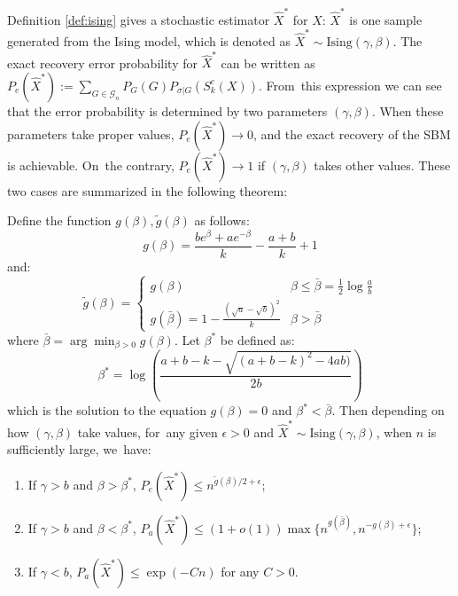 \documentclass[entropy,article,accept,moreauthors,pdftex]{Definitions/mdpi}
\newcommand{\cG}{\mathcal{G}}
\newcommand{\1}{\mathbbm{1}}
\begin{document}
Definition \ref{def:ising} gives a stochastic estimator $\hat{X}^*$ for $X$: $\hat{X}^*$ is one sample generated from the Ising model, which is denoted as
$\hat{X}^* \sim \textrm{Ising}(\gamma, \beta)$.
The exact recovery error probability for $\hat{X}^*$ can be written as $P_e(\hat{X}^*) := \sum_{G \in \cG_n} P_G(G) P_{\sigma | G}(S^c_k(X))$. From~this expression we can see that the error probability is determined
by two parameters $(\gamma, \beta)$. When these parameters take proper values, $ P_e(\hat{X}^*)\to 0$, and the exact recovery of the SBM is achievable. On~the contrary, $P_e(\hat{X}^*) \to 1$ if $(\gamma, \beta)$ takes other values.
These two cases are summarized in the following theorem:
\begin{Theorem}\label{thm:phase_transition}
Define the function $g(\beta), \tilde{g}(\beta)$ as follows:
\begin{equation}
g(\beta) = \frac{be^{\beta} + a e^{-\beta}}{k} - \frac{a+b}{k} +1
\end{equation}
and:
\begin{equation}
\tilde{g}(\beta) = \begin{cases}
g(\beta) & \beta \leq \bar{\beta} = \frac{1}{2}\log \frac{a}{b} \\
g(\bar{\beta}) = 1 - \frac{(\sqrt{a} - \sqrt{b})^2}{k} & \beta > \bar{\beta}
\end{cases}
\end{equation}
where $\bar{\beta} =  \arg\min_{\beta > 0} g(\beta)$.
Let $\beta^*$ be defined as:
\begin{equation}\label{eq:beta_star}
\beta^* = \log\left(\frac{a + b - k - \sqrt{(a + b - k)^2 - 4 a b)}}{2  b}\right)
\end{equation}
which is the solution to the equation $g(\beta) = 0$ and $\beta^* < \bar{\beta}$. Then depending on
how $(\gamma, \beta)$ take values, for~any given $\epsilon > 0$ and $\hat{X}^* \sim \textrm{Ising}(\gamma, \beta)$, when $n$ is sufficiently large, we~have:
\begin{enumerate}
\item If $\gamma > b$ and $\beta > \beta^*$,  $P_e(\hat{X}^*) \leq n^{\tilde{g}(\beta)/2 + \epsilon}$;
\item If $\gamma > b$ and $\beta < \beta^*$, $P_a(\hat{X}^*) \leq (1+o(1))\max\{n^{g(\bar{\beta})}, n^{-g(\beta) + \epsilon}\}$;
\item If $\gamma < b$, $P_a(\hat{X}^*) \leq \exp(-C n)$ for any $C>0$.
\end{enumerate}
\end{Theorem}
\end{document}
